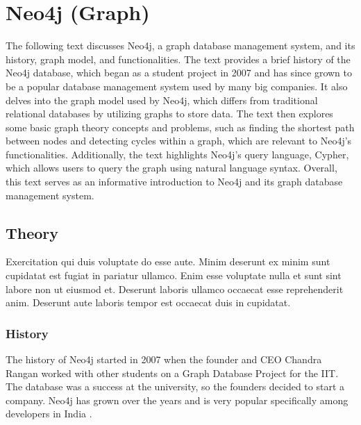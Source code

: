 
\chapter{Neo4j (Graph)} \label{ch:neo4j}

The following text discusses Neo4j, a graph database management system, and its history, graph model, and functionalities. The text provides a brief history of the Neo4j database, which began as a student project in 2007 and has since grown to be a popular database management system used by many big companies. It also delves into the graph model used by Neo4j, which differs from traditional relational databases by utilizing graphs to store data. The text then explores some basic graph theory concepts and problems, such as finding the shortest path between nodes and detecting cycles within a graph, which are relevant to Neo4j's functionalities. Additionally, the text highlights Neo4j's query language, Cypher, which allows users to query the graph using natural language syntax. Overall, this text serves as an informative introduction to Neo4j and its graph database management system.

\section{Theory} \label{sec:theoryNeo4j}

Exercitation qui duis voluptate do esse aute. Minim deserunt ex minim sunt cupidatat est fugiat in pariatur ullamco. Enim esse voluptate nulla et sunt sint labore non ut eiusmod et. Deserunt laboris ullamco occaecat esse reprehenderit anim. Deserunt aute laboris tempor est occaecat duis in cupidatat.

\subsection{History} \label{subsec:historyNeo4j}

The history of Neo4j started in 2007 when the founder and CEO Chandra Rangan worked with other students on a Graph Database Project for the \ac{IIT}. The database was a success at the university, so the founders
decided to start a company. Neo4j has grown over the years and is very popular specifically among developers in India \parencite{historyneo4j}.


